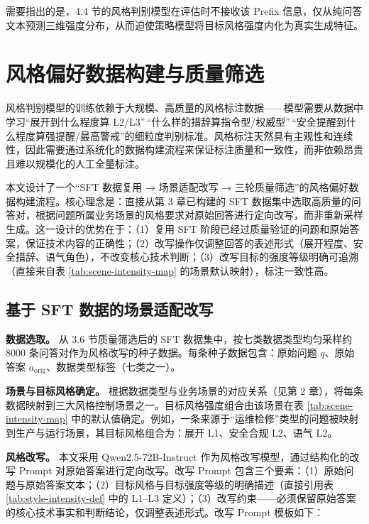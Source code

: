 \documentclass[fontset=fandol,type=master,campus=shenzhen,etitleauto=true]{hithesisbook}
\begin{document}
需要指出的是，4.4 节的风格判别模型在评估时不接收该 Prefix 信息，仅从纯问答文本预测三维强度分布，从而迫使策略模型将目标风格强度内化为真实生成特征。

\section{风格偏好数据构建与质量筛选}\label{ux98ceux683cux504fux597dux6570ux636eux6784ux5efaux4e0e-llm-as-judge-ux7b5bux9009}

风格判别模型的训练依赖于大规模、高质量的风格标注数据------模型需要从数据中学习``展开到什么程度算 L2/L3''\,``什么样的措辞算指令型/权威型''\,``安全提醒到什么程度算强提醒/最高警戒''的细粒度判别标准。风格标注天然具有主观性和连续性，因此需要通过系统化的数据构建流程来保证标注质量和一致性，而非依赖昂贵且难以规模化的人工全量标注。

本文设计了一个``SFT 数据复用 → 场景适配改写 → 三轮质量筛选''的风格偏好数据构建流程。核心理念是：直接从第 3 章已构建的 SFT 数据集中选取高质量的问答对，根据问题所属业务场景的风格要求对原始回答进行定向改写，而非重新采样生成。这一设计的优势在于：（1）复用 SFT 阶段已经过质量验证的问题和原始答案，保证技术内容的正确性；（2）改写操作仅调整回答的表述形式（展开程度、安全措辞、语气角色），不改变核心技术判断；（3）改写目标的强度等级明确可追溯（直接来自表 \ref{tab:scene-intensity-map} 的场景默认映射），标注一致性高。

\subsection{基于 SFT 数据的场景适配改写}\label{ux57faux4e8e-sft-ux6570ux636eux7684ux573aux666fux9002ux914dux6539ux5199}

\textbf{数据选取。} 从 3.6 节质量筛选后的 SFT 数据集中，按七类数据类型均匀采样约 8000 条问答对作为风格改写的种子数据。每条种子数据包含：原始问题 $q$、原始答案 $a_{\text{orig}}$、数据类型标签（七类之一）。

\textbf{场景与目标风格确定。} 根据数据类型与业务场景的对应关系（见第 2 章），将每条数据映射到三大风格控制场景之一。目标风格强度组合由该场景在表 \ref{tab:scene-intensity-map} 中的默认值确定。例如，一条来源于``运维检修''类型的问题被映射到生产与运行场景，其目标风格组合为：展开 L1、安全合规 L2、语气 L2。

\textbf{风格改写。} 本文采用 Qwen2.5-72B-Instruct 作为风格改写模型，通过结构化的改写 Prompt 对原始答案进行定向改写。改写 Prompt 包含三个要素：（1）原始问题与原始答案文本；（2）目标风格与目标强度等级的明确描述（直接引用表 \ref{tab:style-intensity-def} 中的 L1--L3 定义）；（3）改写约束------必须保留原始答案的核心技术事实和判断结论，仅调整表述形式。改写 Prompt 模板如下：
\end{document}
